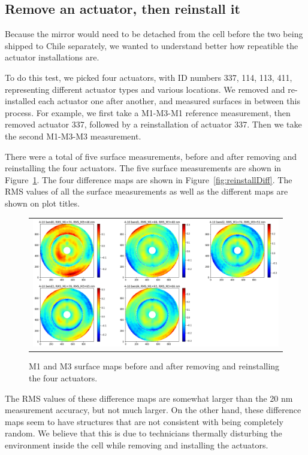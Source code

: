 \documentclass [twoside,openbib,12pt]{article}
\begin{document}
\subsection{Remove an actuator, then reinstall it}

Because the mirror would need to be detached from the cell before the
two being shipped to Chile separately, we wanted to understand better
how repeatible the actuator installations are.

To do this test, we picked four actuators, with ID numbers 337, 114, 113, 411, representing different
actuator types and various locations.
We removed and re-installed each actuator one after another, and
measured surfaces in between this process.
For example, we first take a M1-M3-M1 reference measurement, then
removed actuator 337, followed by a reinstallation of actuator
337. Then we take the second M1-M3-M3 measurement.

There were a total of five surface measurements, before and after
removing and reinstalling the four actuators.
The five surface measurements are shown in Figure~\ref{fig:reinstall}.
The four difference maps are shown in Figure~\ref{fig:reinstallDiff}.
The RMS values of all the surface measurements as well as the
different maps are shown on plot titles.

 \begin{figure}[bthp]
   \begin{center}
   \begin{tabular}{c}
\includegraphics[width=150mm]{figures/reinstall.png}
  \end{tabular}
   \end{center}
   \caption
  { \label{fig:reinstall}
M1 and M3 surface maps before and after
removing and reinstalling the four actuators.
 }
\end{figure}


The RMS values of these difference maps are somewhat larger than the
20 nm measurement accuracy, but not much larger.
On the other hand, these difference maps seem to have structures that
are not consistent with being completely random.
We believe that this is due to technicians thermally disturbing the
environment inside the cell while removing and installing the actuators.
\end{document}
